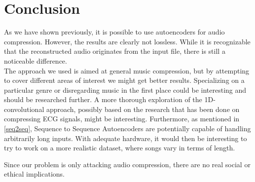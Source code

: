 \documentclass[11pt]{article}
\begin{document}
\section{Conclusion} \label{conclusion}
As we have shown previously, it is possible to use autoencoders for audio compression. However, the results are clearly not lossless. While it is recognizable that the reconstructed audio originates from the input file, there is still a noticeable difference.\\
The approach we used is aimed at general music compression, but by attempting to cover different areas of interest we might get better results. Specializing on a particular genre or disregarding music in the first place could be interesting and should be researched further. 
A more thorough exploration of the 1D-convolutional approach, possibly based on the research that has been done on compressing ECG signals, might be interesting.
Furthermore, as mentioned in \autoref{seq2seq}, Sequence to Sequence Autoencoders are potentially capable of handling arbitrarily long inputs. With adequate hardware, it would then be interesting to try to work on a more realistic dataset, where songs vary in terms of length.\par
Since our problem is only attacking audio compression, there are no real social or ethical implications. 

\cleardoublepage
\printbibliography
\end{document}
